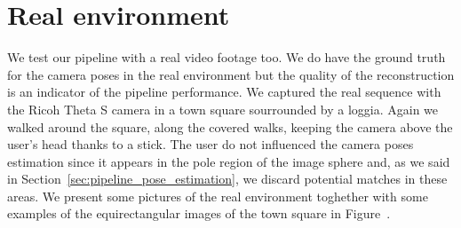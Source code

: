 \section{Real environment}
We test our pipeline with a real video footage too. We do have the ground truth
for the camera poses in the real environment but the quality of the
reconstruction is an indicator of the pipeline performance.
We captured the real sequence with the Ricoh Theta S camera in a town square
sourrounded by a loggia. Again we walked around the square, along the covered
walks, keeping the camera above the user's head thanks to a stick.
The user do not influenced the camera poses estimation since it appears in the
pole region of the image sphere and, as we said in
Section~\ref{sec:pipeline_pose_estimation}, we discard potential matches in
these areas.
We present some pictures of the real environment toghether with some examples
of the equirectangular images of the town square in Figure~.
%
